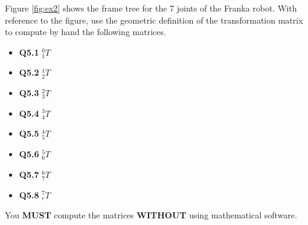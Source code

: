 Figure \ref{fig:ex2} shows the frame tree for the 7 joints of the Franka robot. With reference to the figure, use the geometric definition of the transformation matrix to compute by hand the following matrices.
\begin{itemize}
\item \textbf{Q5.1} \hspace{10mm} $^0_1 T$
\item \textbf{Q5.2} \hspace{10mm} $^1_2 T$
\item \textbf{Q5.3} \hspace{10mm} $^2_3 T$
\item \textbf{Q5.4} \hspace{10mm} $^3_4 T$
\item \textbf{Q5.5} \hspace{10mm} $^4_5 T$
\item \textbf{Q5.6} \hspace{10mm} $^5_6 T$
\item \textbf{Q5.7} \hspace{10mm} $^6_7 T$
\item \textbf{Q5.8} \hspace{10mm} $^7_e T$
\end{itemize}

You \textbf{MUST} compute the matrices \textbf{WITHOUT} using mathematical software.

\newpage
